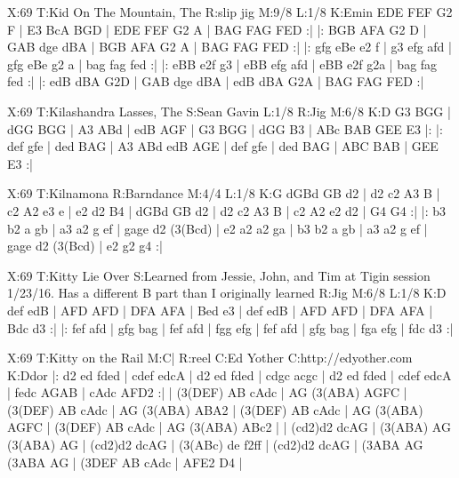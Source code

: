 \documentclass{article}
\begin{document}
\begin{abc}[name]
X:69
T:Kid On The Mountain, The
R:slip jig
M:9/8
L:1/8
K:Emin
EDE FEF G2 F | E3 BcA BGD | EDE FEF G2 A | BAG FAG FED :|
|: BGB AFA G2 D | GAB dge dBA | BGB AFA G2 A | BAG FAG FED :|
|: gfg eBe e2 f | g3 efg afd | gfg eBe g2 a | bag fag fed :|
|: eBB e2f g3 | eBB efg afd | eBB e2f g2a | bag fag fed :|
|: edB dBA G2D | GAB dge dBA | edB dBA G2A | BAG FAG FED :|
\end{abc}

\begin{abc}[name]
X:69
T:Kilashandra Lasses, The
S:Sean Gavin
L:1/8
R:Jig
M:6/8
K:D
G3 BGG | dGG BGG | A3 ABd | edB AGF |
G3 BGG | dGG B3 | ABc BAB GEE E3 |:
|: def gfe | ded BAG | A3 ABd edB AGE |
def gfe | ded BAG | ABC BAB | GEE E3 :|
\end{abc}

\begin{abc}[name]
X:69
T:Kilnamona
R:Barndance
M:4/4
L:1/8
K:G
dGBd GB d2 | d2 c2 A3 B | c2 A2 e3 e | e2 d2 B4 |
dGBd GB d2 | d2 c2 A3 B | c2 A2 e2 d2 | G4 G4 :|
|: b3 b2 a gb | a3 a2 g ef | gage d2 (3(Bcd) | e2 a2 a2 ga |
b3 b2 a gb | a3 a2 g ef | gage d2 (3(Bcd) | e2 g2 g4 :|
\end{abc}

\begin{abc}[name]
X:69
T:Kitty Lie Over
S:Learned from Jessie, John, and Tim at Tigin session 1/23/16. Has a different B part than I originally learned
R:Jig
M:6/8
L:1/8
K:D
def edB | AFD AFD | DFA AFA | Bed e3 |
def edB | AFD AFD | DFA AFA | Bdc d3 :|
|: fef afd | gfg bag | fef afd | fgg efg |
fef afd | gfg bag | fga efg | fdc d3 :|
\end{abc}

\begin{abc}[name]
X:69
T:Kitty on the Rail
M:C|
R:reel
C:Ed Yother
C:http://edyother.com
K:Ddor
|: d2 ed fded | cdef edcA | d2 ed fded | cdgc acgc |
d2 ed fded | cdef edcA | fedc AGAB | cAdc AFD2 :|
| (3(DEF) AB cAdc | AG (3(ABA) AGFC | (3(DEF) AB cAdc | AG (3(ABA) ABA2 |
(3(DEF) AB cAdc | AG (3(ABA) AGFC | (3(DEF) AB cAdc | AG (3(ABA) ABc2 |
| ({c}d2)d2 dcAG | (3(ABA) AG (3(ABA) AG | ({c}d2)d2 dcAG | (3(ABc) de f2ff |
({c}d2)d2 dcAG | (3ABA AG (3ABA AG | (3DEF AB cAdc | AFE2 D4 |
\end{abc}
\end{document}
